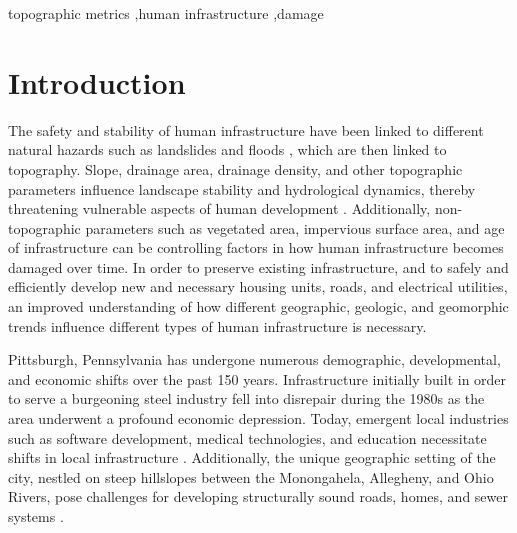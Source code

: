 \documentclass[final,12pt,times,twocolumn,authoryear]{elsarticle}
\begin{document}
\begin{frontmatter}
\begin{abstract}
\end{abstract}

\begin{keyword}
topographic metrics \sep human infrastructure  \sep damage


\end{keyword}

\end{frontmatter}


\section{Introduction}
\label{s:intro}

The safety and stability of human infrastructure have been linked to different natural hazards such as landslides \citep{Polemio1999,Whitehead2009a,VonRuette2011} and floods \citep{Skilodimou2003,Arnaud-Fassetta2005,Youssef2011}, which are then linked to topography. Slope, drainage area, drainage density, and other topographic parameters influence landscape stability and hydrological dynamics, thereby threatening vulnerable aspects of human development \citep{Istanbulluoglu2005,Arnaud-Fassetta2005,Whitehead2009a}. Additionally, non-topographic parameters such as vegetated area, impervious surface area, and age of infrastructure can be controlling factors in how human infrastructure becomes damaged over time. In order to preserve existing infrastructure, and to safely and efficiently develop new and necessary housing units, roads, and electrical utilities, an improved understanding of how different geographic, geologic, and geomorphic trends influence different types of human infrastructure is necessary.

Pittsburgh, Pennsylvania has undergone numerous demographic, developmental, and economic shifts over the past 150 years. Infrastructure initially built in order to serve a burgeoning steel industry fell into disrepair during the 1980s as the area underwent a profound economic depression. Today, emergent local industries such as software development, medical technologies, and education necessitate shifts in local infrastructure \citep{Andes2017}. Additionally, the unique geographic setting of the city, nestled on steep hillslopes between the Monongahela, Allegheny, and Ohio Rivers, pose challenges for developing structurally sound roads, homes, and sewer systems \citep{Hopkins2014}.
\end{document}

